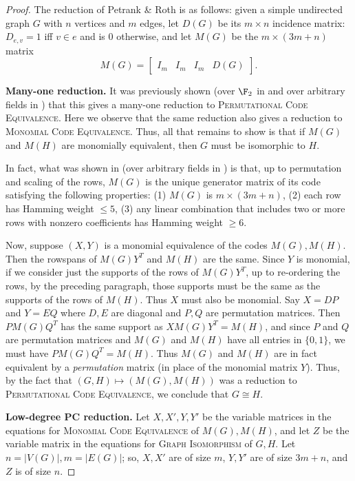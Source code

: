 \begin{proof}
The reduction of Petrank \& Roth is as follows: given a simple undirected graph $G$ with $n$ vertices and $m$ edges, let $D(G)$ be its $m \times n$ incidence matrix: $D_{e,v} = 1$ iff $v \in e$ and is 0 otherwise, and let $M(G)$ be the $m \times (3m + n)$ matrix 
\[
M(G) = \left[
\begin{array}{c|c|c|c}
I_m & I_m & I_m & D(G)
\end{array}
\right].
\]

\textbf{Many-one reduction.} It was previously shown (over $\F_2$ in \cite{PR} and over arbitrary fields in \cite[Lem.~II.4]{GrochowLie}) that this gives a many-one reduction to \textsc{Permutational Code Equivalence}. Here we observe that the same reduction also gives a reduction to \textsc{Monomial Code Equivalence}. Thus, all that remains to show is that if $M(G)$ and $M(H)$ are monomially equivalent, then $G$ must be isomorphic to $H$. 

In fact, what was shown in \cite{PR} (over arbitrary fields in \cite{GrochowLie}) is that, up to permutation and scaling of the rows, $M(G)$ is the unique generator matrix of its code satisfying the following properties: (1) $M(G)$ is $m \times (3m+n)$, (2) each row has Hamming weight $\leq 5$, (3) any linear combination that includes two or more rows with nonzero coefficients has Hamming weight $\geq 6$. 

Now, suppose $(X,Y)$ is a monomial equivalence of the codes $M(G), M(H)$. Then the rowspans of $M(G) Y^T$ and $M(H)$ are the same. Since $Y$ is monomial, if we consider just the supports of the rows of $M(G) Y^T$, up to re-ordering the rows, by the preceding paragraph, those supports must be the same as the supports of the rows of $M(H)$. Thus $X$ must also be monomial. Say $X = DP$ and $Y=EQ$ where $D,E$ are diagonal and $P,Q$ are permutation matrices. Then $P M(G) Q^T$ has the same support as $X M(G) Y^T = M(H)$, and since $P$ and $Q$ are permutation matrices and $M(G)$ and $M(H)$ have all entries in $\{0,1\}$, we must have $P M(G) Q^T = M(H)$. Thus $M(G)$ and $M(H)$ are in fact equivalent by a \emph{permutation} matrix (in place of the monomial matrix $Y$). Thus, by the fact that $(G,H) \mapsto (M(G), M(H))$ was a reduction to \textsc{Permutational Code Equivalence}, we conclude that $G \cong H$.


\textbf{Low-degree PC reduction.} Let $X,X',Y,Y'$ be the variable matrices in the equations for \textsc{Monomial Code Equivalence} of $M(G), M(H)$, and let $Z$ be the variable matrix in the equations for \textsc{Graph Isomorphism} of $G,H$. Let $n = |V(G)|, m = |E(G)|$; so, $X,X'$ are of size $m$, $Y,Y'$ are of size $3m+n$, and $Z$ is of size $n$. 


\end{proof}
